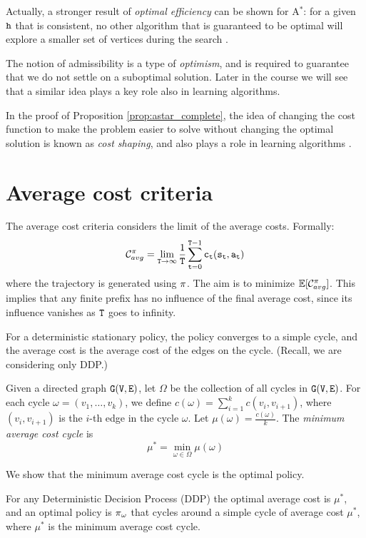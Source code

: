 \begin{remark}
    Actually, a stronger result of \textit{optimal efficiency} can be shown for A$^*$: for a given ${\tt h}$ that is consistent, no other algorithm that is guaranteed to be optimal will explore a smaller set of vertices during the search \cite{hart1968formal}.
\end{remark}
\begin{remark}
    The notion of admissibility is a type of \emph{optimism}, and is required to guarantee that we do not settle on a suboptimal solution. Later in the course we will see that a similar idea plays a key role also in learning algorithms. 
\end{remark}
\begin{remark}
    In the proof of Proposition \ref{prop:astar_complete}, the idea of changing the cost function to make the problem easier to solve without changing the optimal solution is known as \textit{cost shaping}, and also plays a role in learning algorithms \cite{ng1999policy}.
\end{remark}

\section{Average cost criteria}

The average cost criteria considers the limit of the average costs.
Formally:
\[
\mathcal{C}_{avg}^\pi=\lim_{{\tt T}\rightarrow \infty}
\frac{1}{{\tt T}} \sum_{{\tt t}=0}^{{\tt T}-1}
{\tt c}_{\tt t}({\tt s}_{\tt t},{\tt a}_{\tt t})
\]
where the trajectory is generated using $\pi$. The aim is to
minimize $\mathbb{E}[\mathcal{C}^\pi_{avg}]$. This implies that any finite
prefix has no influence of the final average cost, since its
influence vanishes as ${\tt T}$ goes to infinity.

For a deterministic stationary policy, the policy converges to a
simple cycle, and the average cost is the average cost of the edges
on the cycle. (Recall, we are considering only DDP.)

Given a directed graph ${\tt G}({\tt V},{\tt E})$, let $\Omega$ be the collection of
all cycles in ${\tt G}({\tt V},{\tt E})$. For each cycle $\omega=(v_1, \ldots ,
v_{k})$, we define $c(\omega)=\sum_{i=1}^k c(v_i,v_{i+1})$, where
$(v_i,v_{i+1})$ is the $i$-th edge in the cycle $\omega$. Let
$\mu(\omega)=\frac{c(\omega)}{k}$. The {\em minimum average cost cycle}
is
\[
\mu^*=\min_{\omega\in\Omega} \mu(\omega)
\]

We show that the minimum average cost cycle is the optimal policy.
\begin{theorem}
For any Deterministic Decision Process (DDP) the optimal average
cost is $\mu^*$, and an optimal policy is $\pi_{\omega}$ that
cycles around a simple cycle of average cost $\mu^*$, where $\mu^*$ is the minimum average cost cycle.
\end{theorem}

